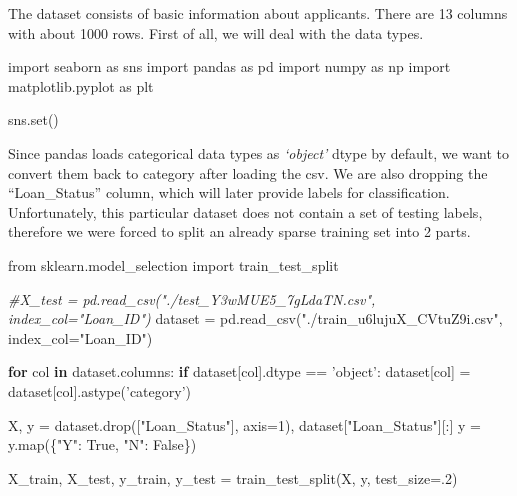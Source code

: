 \documentclass[]{article}
\newenvironment{Shaded}{}{}
\newcommand{\BuiltInTok}[1]{#1}
\newcommand{\CommentTok}[1]{\textcolor[rgb]{0.38,0.63,0.69}{\textit{#1}}}
\newcommand{\ControlFlowTok}[1]{\textcolor[rgb]{0.00,0.44,0.13}{\textbf{#1}}}
\newcommand{\DecValTok}[1]{\textcolor[rgb]{0.25,0.63,0.44}{#1}}
\newcommand{\ImportTok}[1]{#1}
\newcommand{\KeywordTok}[1]{\textcolor[rgb]{0.00,0.44,0.13}{\textbf{#1}}}
\newcommand{\NormalTok}[1]{#1}
\newcommand{\OperatorTok}[1]{\textcolor[rgb]{0.40,0.40,0.40}{#1}}
\newcommand{\StringTok}[1]{\textcolor[rgb]{0.25,0.44,0.63}{#1}}
\newcommand{\VariableTok}[1]{\textcolor[rgb]{0.10,0.09,0.49}{#1}}
\begin{document}
The dataset consists of basic information about applicants. There are 13
columns with about 1000 rows. First of all, we will deal with the data
types.

\begin{Shaded}
\begin{Highlighting}[]
\ImportTok{import}\NormalTok{ seaborn }\ImportTok{as}\NormalTok{ sns}
\ImportTok{import}\NormalTok{ pandas }\ImportTok{as}\NormalTok{ pd}
\ImportTok{import}\NormalTok{ numpy }\ImportTok{as}\NormalTok{ np}
\ImportTok{import}\NormalTok{ matplotlib.pyplot }\ImportTok{as}\NormalTok{ plt}

\NormalTok{sns.}\BuiltInTok{set}\NormalTok{()}
\end{Highlighting}
\end{Shaded}

Since pandas loads categorical data types as \emph{`object'} dtype by
default, we want to convert them back to category after loading the csv.
We are also dropping the ``Loan\_Status'' column, which will later
provide labels for classification. Unfortunately, this particular
dataset does not contain a set of testing labels, therefore we were
forced to split an already sparse training set into 2 parts.

\begin{Shaded}
\begin{Highlighting}[]
\ImportTok{from}\NormalTok{ sklearn.model_selection }\ImportTok{import}\NormalTok{ train_test_split}

\CommentTok{#X_test = pd.read_csv("./test_Y3wMUE5_7gLdaTN.csv", index_col="Loan_ID")}
\NormalTok{dataset }\OperatorTok{=}\NormalTok{ pd.read_csv(}\StringTok{"./train_u6lujuX_CVtuZ9i.csv"}\NormalTok{, index_col}\OperatorTok{=}\StringTok{"Loan_ID"}\NormalTok{)}

\ControlFlowTok{for}\NormalTok{ col }\KeywordTok{in}\NormalTok{ dataset.columns:}
    \ControlFlowTok{if}\NormalTok{ dataset[col].dtype }\OperatorTok{==} \StringTok{'object'}\NormalTok{:}
\NormalTok{        dataset[col] }\OperatorTok{=}\NormalTok{ dataset[col].astype(}\StringTok{'category'}\NormalTok{)}

\NormalTok{X, y }\OperatorTok{=}\NormalTok{ dataset.drop([}\StringTok{"Loan_Status"}\NormalTok{], axis}\OperatorTok{=}\DecValTok{1}\NormalTok{), dataset[}\StringTok{"Loan_Status"}\NormalTok{][:]}
\NormalTok{y }\OperatorTok{=}\NormalTok{ y.}\BuiltInTok{map}\NormalTok{(\{}\StringTok{"Y"}\NormalTok{: }\VariableTok{True}\NormalTok{, }\StringTok{"N"}\NormalTok{: }\VariableTok{False}\NormalTok{\})}

\NormalTok{X_train, X_test, y_train, y_test }\OperatorTok{=}\NormalTok{ train_test_split(X, y, test_size}\OperatorTok{=}\NormalTok{.}\DecValTok{2}\NormalTok{)}
\end{Highlighting}
\end{Shaded}
\end{document}
